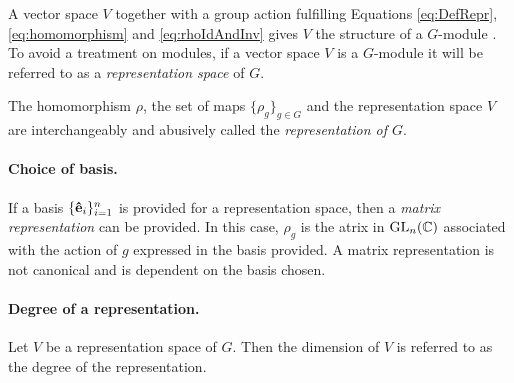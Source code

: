 \begin{note}
	A vector space $V$ together with a group action fulfilling Equations \ref{eq:DefRepr}, \ref{eq:homomorphism} and \ref{eq:rhoIdAndInv} gives $V$ the structure of a $G$-module \cite[1.3]{Sagan}. To avoid a treatment on modules, if a vector space $V$ is a $G$-module it will be referred to as a \textit{representation space} of $G$.
\end{note}

\begin{note}
	The homomorphism $\rho$, the set of maps $\{\rho_g\}_{g \in G}$ and the representation space $V$ are interchangeably and abusively called the \textit{representation of $G$}.
\end{note}

\paragraph{Choice of basis.} 

If a basis $\{\mathbf{\hat{e}}_i\}_{i=1}^n$ is provided for a representation space, then a \textit{matrix representation} can be provided. In this case, $\rho_g$ is the atrix in $\text{GL}_n(\mathbb{C})$ associated with the action of $g$ expressed in the basis provided. A matrix representation is not canonical and is dependent on the basis chosen.

\paragraph{Degree of a representation.} 

\begin{definition}
	Let $V$ be a representation space of $G$. Then the dimension of $V$ is referred to as the degree of the representation.
\end{definition}	